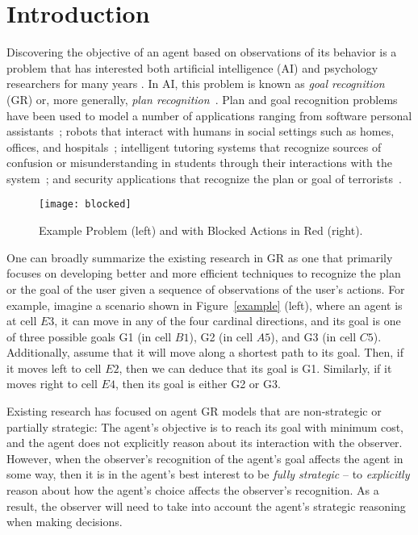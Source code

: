 \chapter{Introduction}

Discovering the objective of an agent based on observations of its behavior is a problem that 
has interested both artificial intelligence (AI) and psychology researchers for many years \cite{schmidt:78,kautz:87}. 
In AI, this problem is known as \emph{goal recognition} (GR) or, more generally, \emph{plan recognition}~\cite{Sukthankar:14}. 
Plan and goal recognition problems have been used to model a number of applications ranging from software personal assistants~\cite{oh:10,oh:11,oh:11b}; 
robots that interact with humans in social settings such as homes, offices, and hospitals~\cite{tavakkoli:07,kelley:12}; 
intelligent tutoring systems that recognize sources of confusion or misunderstanding in students through 
their interactions with the system~\cite{mcquiggan:08,johnson:10,lee:12,min:14}; and security applications that recognize the plan or goal of terrorists~\cite{jarvis:05}. 


\begin{figure}[h!]
\begin{center}

  \texttt{[image: blocked]}
  \end{center}

  \caption{Example Problem (left) and with Blocked Actions in Red (right).}
  \label{fig:blocked}
\end{figure}

One can broadly summarize the existing research in GR as one that primarily focuses on developing better and more 
efficient techniques to recognize the plan or the goal of the user given a sequence of observations of the user's actions. For example, imagine a %
scenario shown in Figure~\ref{example} (left), where an agent %
is at cell $E3$, it can move in any of the four cardinal directions, and its goal is one of three possible goals G1 (in cell $B1$), G2 (in cell $A5$), and G3 (in cell $C5$). Additionally, assume that it will move along a shortest path to its goal. Then, if it moves left to cell $E2$, then we can deduce that its goal is G1. Similarly, if it moves right to cell $E4$, then its goal is either G2 or G3. 

Existing research has focused on agent GR models that are non-strategic or
partially strategic: The agent's objective is to reach its goal with minimum cost, 
and the agent does not explicitly reason about its interaction with the observer.
However, when the observer's recognition of the agent's goal affects the agent in some way, 
then it is in the agent's best interest to be \emph{fully strategic} -- to \emph{explicitly} 
reason about how the agent's choice affects the observer's recognition. 
As a result, the observer will need to take into account the agent's strategic reasoning when making decisions.

